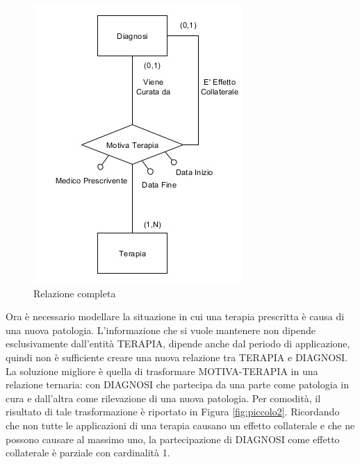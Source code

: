 \documentclass{article}
\begin{document}
\begin{figure}[!ht]
\begin{minipage}{.5\textwidth}
    \includegraphics[width=\linewidth]{piccolo2}
    \caption{Relazione completa}
    \label{fig:piccolo2}
  \end{minipage}
\end{figure}

Ora è necessario modellare la situazione in cui una terapia prescritta è causa
di una nuova patologia.  L'informazione che si vuole mantenere non dipende
esclusivamente dall'entità TERAPIA, dipende anche dal periodo di applicazione,
quindi non è sufficiente creare una nuova relazione tra TERAPIA e DIAGNOSI.  La
soluzione migliore è quella di trasformare MOTIVA-TERAPIA in una relazione
ternaria: con DIAGNOSI che partecipa da una parte come patologia in cura e
dall'altra come rilevazione di una nuova patologia.  Per comodità, il risultato
di tale trasformazione è riportato in Figura \autoref{fig:piccolo2}.  Ricordando
che non tutte le applicazioni di una terapia causano un effetto collaterale e
che ne possono causare al massimo uno, la partecipazione di DIAGNOSI come
effetto collaterale è parziale con cardinalità 1.
\end{document}
